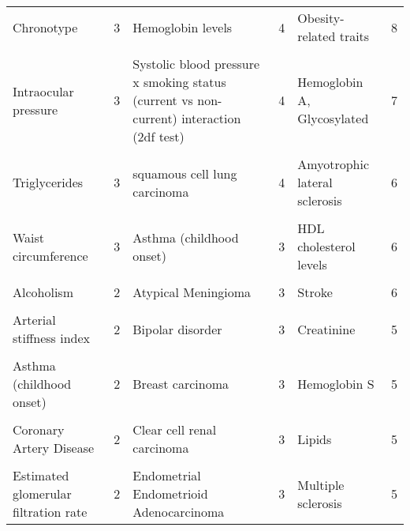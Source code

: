 \begin{table}[H]
{\begin{tabular}[t]{lrlrlr}
Chronotype & 3 & Hemoglobin levels & 4 & Obesity-related traits & 8\\
\cellcolor{gray!6}{Diastolic blood pressure} & \cellcolor{gray!6}{3} & \cellcolor{gray!6}{Refractive error} & \cellcolor{gray!6}{4} & \cellcolor{gray!6}{Heart failure} & \cellcolor{gray!6}{7}\\
Intraocular pressure & 3 & Systolic blood pressure x smoking status (current vs non-current) interaction (2df test) & 4 & Hemoglobin A, Glycosylated & 7\\
\cellcolor{gray!6}{Iron} & \cellcolor{gray!6}{3} & \cellcolor{gray!6}{Systolic blood pressure x smoking status (ever vs never) interaction (2df test)} & \cellcolor{gray!6}{4} & \cellcolor{gray!6}{Triglycerides} & \cellcolor{gray!6}{7}\\
Triglycerides & 3 & squamous cell lung carcinoma & 4 & Amyotrophic lateral sclerosis & 6\\
\cellcolor{gray!6}{Type 2 diabetes} & \cellcolor{gray!6}{3} & \cellcolor{gray!6}{Acute myeloid leukemia} & \cellcolor{gray!6}{3} & \cellcolor{gray!6}{Chronotype} & \cellcolor{gray!6}{6}\\
Waist circumference & 3 & Asthma (childhood onset) & 3 & HDL cholesterol levels & 6\\
\cellcolor{gray!6}{Alcoholic chronic pancreatitis} & \cellcolor{gray!6}{2} & \cellcolor{gray!6}{Attention deficit hyperactivity disorder} & \cellcolor{gray!6}{3} & \cellcolor{gray!6}{Lipoproteins, VLDL} & \cellcolor{gray!6}{6}\\
Alcoholism & 2 & Atypical Meningioma & 3 & Stroke & 6\\
\cellcolor{gray!6}{Aorta} & \cellcolor{gray!6}{2} & \cellcolor{gray!6}{Basal cell carcinoma} & \cellcolor{gray!6}{3} & \cellcolor{gray!6}{Coronary Artery Disease} & \cellcolor{gray!6}{5}\\
Arterial stiffness index & 2 & Bipolar disorder & 3 & Creatinine & 5\\
\cellcolor{gray!6}{Asthma} & \cellcolor{gray!6}{2} & \cellcolor{gray!6}{Blood protein levels} & \cellcolor{gray!6}{3} & \cellcolor{gray!6}{Heel bone mineral density} & \cellcolor{gray!6}{5}\\
Asthma (childhood onset) & 2 & Breast carcinoma & 3 & Hemoglobin S & 5\\
\cellcolor{gray!6}{Body Fat Distribution} & \cellcolor{gray!6}{2} & \cellcolor{gray!6}{Chronic lymphocytic leukemia} & \cellcolor{gray!6}{3} & \cellcolor{gray!6}{Inborn genetic diseases} & \cellcolor{gray!6}{5}\\
Coronary Artery Disease & 2 & Clear cell renal carcinoma & 3 & Lipids & 5\\
\cellcolor{gray!6}{Erythrocyte Count} & \cellcolor{gray!6}{2} & \cellcolor{gray!6}{Cutaneous melanoma} & \cellcolor{gray!6}{3} & \cellcolor{gray!6}{Lung adenocarcinoma} & \cellcolor{gray!6}{5}\\
Estimated glomerular filtration rate & 2 & Endometrial Endometrioid Adenocarcinoma & 3 & Multiple sclerosis & 5\\
\bottomrule
\end{tabular}}
\end{table}
